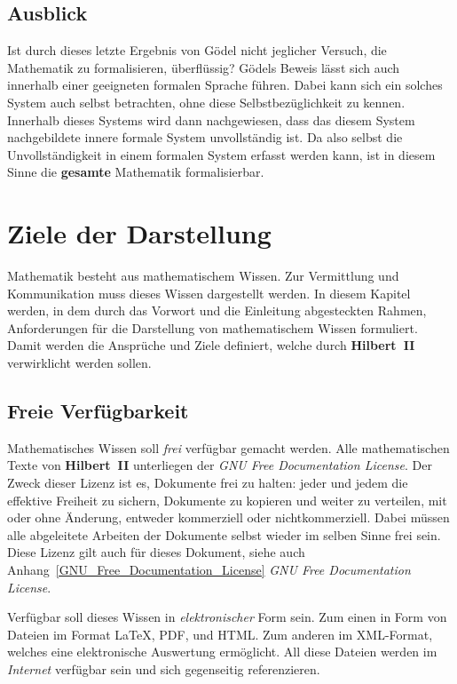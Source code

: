 \documentclass[a4paper,german,10pt,twoside]{book}
\begin{document}
\section*{Ausblick}
Ist durch dieses letzte Ergebnis von G{\"o}del nicht jeglicher Versuch, die Mathematik zu
formalisieren, {\"u}berfl{\"u}ssig? G{\"o}dels Beweis l{\"a}sst sich auch innerhalb einer geeigneten formalen
Sprache f{\"u}hren. Dabei kann sich ein solches System auch selbst betrachten, ohne diese
Selbstbez{\"u}glichkeit zu kennen. Innerhalb dieses Systems wird dann nachgewiesen, dass das diesem
System nachgebildete innere formale System unvollst{\"a}ndig ist. Da also selbst die Unvollst{\"a}ndigkeit
in einem formalen System erfasst werden kann, ist in diesem Sinne die \textbf{gesamte} Mathematik
formalisierbar.


\chapter{Ziele der Darstellung} \label{Ziele_der_Darstellung}

Mathematik besteht aus mathematischem Wissen. Zur Vermittlung und Kommunikation muss dieses Wissen
dargestellt werden. In diesem Kapitel werden, in dem durch das Vorwort und die Einleitung
abgesteckten Rahmen, Anforderungen f{\"u}r die Darstellung von mathematischem Wissen formuliert. Damit
werden die Anspr{\"u}che und Ziele definiert, welche durch \textbf{Hilbert~II} verwirklicht werden
sollen.

\section{Freie Verf{\"u}gbarkeit}
Mathematisches Wissen soll \emph{frei} verf{\"u}gbar gemacht werden. Alle mathematischen Texte von
\textbf{Hilbert~II} unterliegen der \emph{GNU Free Documentation License}. Der Zweck dieser Lizenz
ist es, Dokumente frei zu halten: jeder und jedem die effektive Freiheit zu sichern, Dokumente zu
kopieren und weiter zu verteilen, mit oder ohne {\"A}nderung, entweder kommerziell oder
nichtkommerziell. Dabei m{\"u}ssen alle abgeleitete Arbeiten der Dokumente selbst wieder im selben
Sinne frei sein. Diese Lizenz gilt auch f{\"u}r dieses Dokument, siehe auch
Anhang~\ref{GNU_Free_Documentation_License} \emph{GNU Free Documentation License}.
\par
Verf{\"u}gbar soll dieses Wissen in \emph{elektronischer} Form sein. Zum einen in Form von Dateien im
Format \LaTeX{}, PDF, und HTML. Zum anderen im XML-Format, welches eine elektronische Auswertung
erm{\"o}glicht. All diese Dateien werden im \emph{Internet} verf{\"u}gbar sein und sich gegenseitig
referenzieren.
\end{document}

